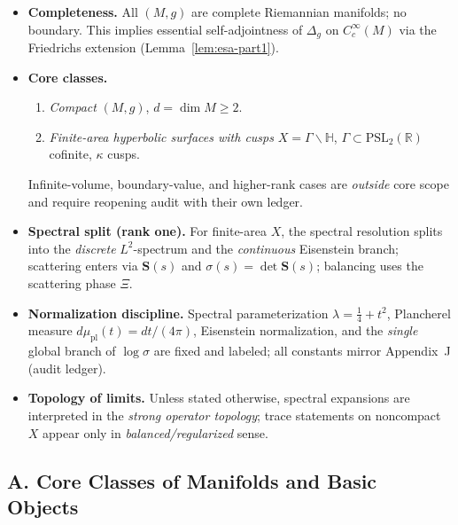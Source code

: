 \begin{tcolorbox}[colback=gray!5,colframe=gray!55,
  title=Scope \& Assumptions (ZNB-9+++ • Brilliants 20/10 • Live-Ledger Anchored)]
\begin{itemize}
  \item \textbf{Completeness.} All $(M,g)$ are complete Riemannian manifolds; no boundary. This implies essential self-adjointness of $\Delta_g$ on $C_c^\infty(M)$ via the Friedrichs extension (Lemma~\ref{lem:esa-part1}).
  \item \textbf{Core classes.}
  \begin{enumerate}[label=(\roman*)]
    \item \emph{Compact} $(M,g)$, $d=\dim M\ge 2$.
    \item \emph{Finite-area hyperbolic surfaces with cusps} $X=\Gamma\backslash\mathbb H$, $\Gamma\subset\mathrm{PSL}_2(\mathbb R)$ cofinite, $\kappa$ cusps.
  \end{enumerate}
  Infinite-volume, boundary-value, and higher-rank cases are \emph{outside} core scope and require reopening audit with their own ledger.
  \item \textbf{Spectral split (rank one).} For finite-area $X$, the spectral resolution splits into the \emph{discrete} $L^2$-spectrum and the \emph{continuous} Eisenstein branch; scattering enters via $\mathbf S(s)$ and $\sigma(s)=\det\mathbf S(s)$; balancing uses the scattering phase $\Xi$.
  \item \textbf{Normalization discipline.} Spectral parameterization $\lambda=\tfrac14+t^2$, Plancherel measure $d\mu_{\mathrm{pl}}(t)=dt/(4\pi)$, Eisenstein normalization, and the \emph{single} global branch of $\log\sigma$ are fixed and labeled; all constants mirror Appendix~J (audit ledger).
  \item \textbf{Topology of limits.} Unless stated otherwise, spectral expansions are interpreted in the \emph{strong operator topology}; trace statements on noncompact $X$ appear only in \emph{balanced/regularized} sense.
\end{itemize}
\end{tcolorbox}

\subsection*{A. Core Classes of Manifolds and Basic Objects}
\label{subsec:classes-sharp-patched-20-10}

